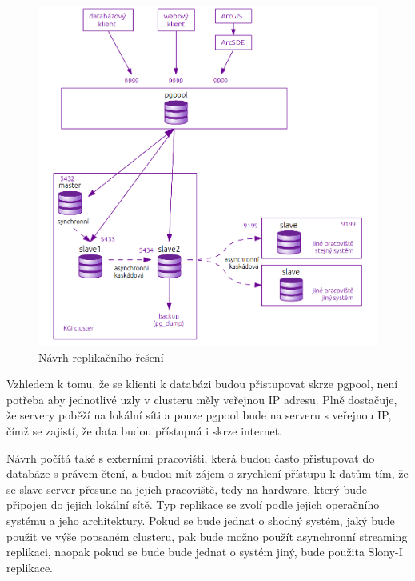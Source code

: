       \begin{figure}[H]
        \label{oNavrhKatedra}
        \centering
        \includegraphics[scale=1]{../../../grafy/obr/schema_navrhKatedra.png}
        \caption {Návrh replikačního řešení}
      \end{figure}

Vzhledem k tomu, že se klienti k databázi budou přistupovat skrze pgpool, není potřeba aby jednotlivé uzly v clusteru měly veřejnou IP adresu. Plně dostačuje, že servery poběží na lokální síti a pouze pgpool bude na serveru s veřejnou IP, čímž se zajistí, že data budou přístupná i skrze internet. 

Návrh počítá také s externími pracovišti, která budou často přistupovat do databáze s právem čtení, a budou mít zájem o zrychlení přístupu k datům tím, že se slave server přesune na jejich pracoviště, tedy na hardware, který bude připojen do jejich lokální sítě. Typ replikace se zvolí podle jejich operačního systému a jeho architektury. Pokud se bude jednat o shodný systém, jaký bude použit ve výše popsaném clusteru, pak bude možno použít asynchronní streaming replikaci, naopak pokud se bude bude jednat o systém jiný, bude použita Slony-I replikace. 

